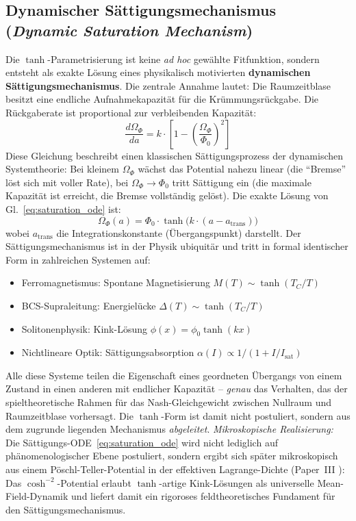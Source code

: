 \documentclass[aps,prd,twocolumn,superscriptaddress,nofootinbib]{revtex4-2}
\begin{document}
\subsection{Dynamischer S\"attigungsmechanismus (\textit{Dynamic Saturation Mechanism})}
\label{subsec:tanh_herleitung}

Die $\tanh$-Parametrisierung ist keine \textit{ad hoc} gew\"ahlte Fitfunktion, sondern entsteht als exakte L\"osung eines physikalisch motivierten \textbf{dynamischen S\"attigungsmechanismus}. Die zentrale Annahme lautet: Die Raumzeitblase besitzt eine endliche Aufnahmekapazit\"at f\"ur die Kr\"ummungsr\"uckgabe. Die R\"uckgaberate ist proportional zur verbleibenden Kapazit\"at:
\begin{equation}
\frac{d\Omega_\Phi}{da} = k \cdot \left[1 - \left(\frac{\Omega_\Phi}{\Phi_0}\right)^{\!2}\right]
\label{eq:saturation_ode}
\end{equation}
Diese Gleichung beschreibt einen klassischen S\"attigungsprozess der dynamischen Systemtheorie: Bei kleinem $\Omega_\Phi$ w\"achst das Potential nahezu linear (die ``Bremse'' l\"ost sich mit voller Rate), bei $\Omega_\Phi \to \Phi_0$ tritt S\"attigung ein (die maximale Kapazit\"at ist erreicht, die Bremse vollst\"andig gel\"ost). Die exakte L\"osung von Gl.~\eqref{eq:saturation_ode} ist:
\begin{equation}
\Omega_\Phi(a) = \Phi_0 \cdot \tanh\!\big(k\cdot(a - a_{\mathrm{trans}})\big)
\end{equation}
wobei $a_{\mathrm{trans}}$ die Integrationskonstante (\"Ubergangspunkt) darstellt. Der S\"attigungsmechanismus ist in der Physik ubiquit\"ar und tritt in formal identischer Form in zahlreichen Systemen auf:
\begin{itemize}
\item Ferromagnetismus: Spontane Magnetisierung $M(T) \sim \tanh(T_C/T)$
\item BCS-Supraleitung: Energiel\"ucke $\Delta(T) \sim \tanh(T_C/T)$
\item Solitonenphysik: Kink-L\"osung $\phi(x) = \phi_0 \tanh(kx)$
\item Nichtlineare Optik: S\"attigungsabsorption $\alpha(I) \propto 1/(1 + I/I_{\mathrm{sat}})$
\end{itemize}
Alle diese Systeme teilen die Eigenschaft eines geordneten \"Ubergangs von einem Zustand in einen anderen mit endlicher Kapazit\"at -- \textit{genau} das Verhalten, das der spieltheoretische Rahmen f\"ur das Nash-Gleichgewicht zwischen Nullraum und Raumzeitblase vorhersagt. Die $\tanh$-Form ist damit nicht postuliert, sondern aus dem zugrunde liegenden Mechanismus \textit{abgeleitet}. \textit{Mikroskopische Realisierung:} Die S\"attigungs-ODE~\eqref{eq:saturation_ode} wird nicht lediglich auf ph\"anomenologischer Ebene postuliert, sondern ergibt sich sp\"ater mikroskopisch aus einem P\"oschl-Teller-Potential in der effektiven Lagrange-Dichte (Paper~III \cite{Geiger2026c}): Das $\cosh^{-2}$-Potential erlaubt $\tanh$-artige Kink-L\"osungen als universelle Mean-Field-Dynamik und liefert damit ein rigoroses feldtheoretisches Fundament f\"ur den S\"attigungsmechanismus.
\end{document}
